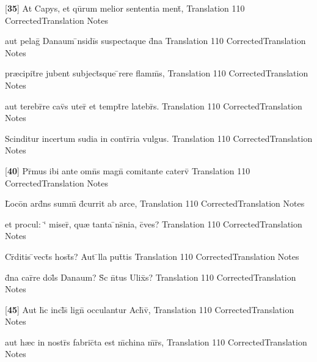 \latline
  {[\textbf{35}] At Capys, et qu\={}rum melior sententia ment\={\macron {\i}},}
  { Translation }
  {110}
  { CorrectedTranslation }
  { Notes }


\latline
  {aut pelag\={} Danaum \={\macron {\i}}nsidi\={}s suspectaque d\={}na}
  { Translation }
  {110}
  { CorrectedTranslation }
  { Notes }


\latline
  {pr{\ae}cipit\={}re jubent subject\={\macron {\i}}sque \={}rere flamm\={\macron {\i}}s,}
  { Translation }
  {110}
  { CorrectedTranslation }
  { Notes }


\latline
  {aut terebr\={}re cav\={}s uter\={\macron {\i}} et tempt\={}re latebr\={}s.}
  { Translation }
  {110}
  { CorrectedTranslation }
  { Notes }


\latline
  {Scinditur incertum sudia in contr\={}ria vulgus.}
  { Translation }
  {110}
  { CorrectedTranslation }
  { Notes }


\latline
  {[\textbf{40}] Pr\={\macron {\i}}mus ibi ante omn\={\macron {\i}}s magn\={} comitante caterv\={}}
  { Translation }
  {110}
  { CorrectedTranslation }
  { Notes }


\latline
  {L\={}oco\={}n ard\={}ns summ\={} d\={}currit ab arce,}
  { Translation }
  {110}
  { CorrectedTranslation }
  { Notes }


\latline
  {et procul: `\={} miser\={\macron {\i}}, qu{\ae} tanta \={\macron {\i}}ns\={}nia, c\={\macron {\i}}ves?  }
  { Translation }
  {110}
  { CorrectedTranslation }
  { Notes }


\latline
  {Cr\={}ditis \={}vect\={}s host\={\macron {\i}}s?  Aut \={}lla put\={}tis}
  { Translation }
  {110}
  { CorrectedTranslation }
  { Notes }


\latline
  {d\={}na car\={}re dol\={\macron {\i}}s Danaum?  S\={\macron {\i}}c n\={}tus Ulix\={}s?}
  { Translation }
  {110}
  { CorrectedTranslation }
  { Notes }


\latline
  {[\textbf{45}] Aut h\={}c incl\={}s\={\macron {\i}} lign\={} occulantur Ach\={\macron {\i}}v\={\macron {\i}},}
  { Translation }
  {110}
  { CorrectedTranslation }
  { Notes }


\latline
  {aut h{\ae}c in nostr\={}s fabric\={}ta est m\={}china m\={}r\={}s,}
  { Translation }
  {110}
  { CorrectedTranslation }
  { Notes }


